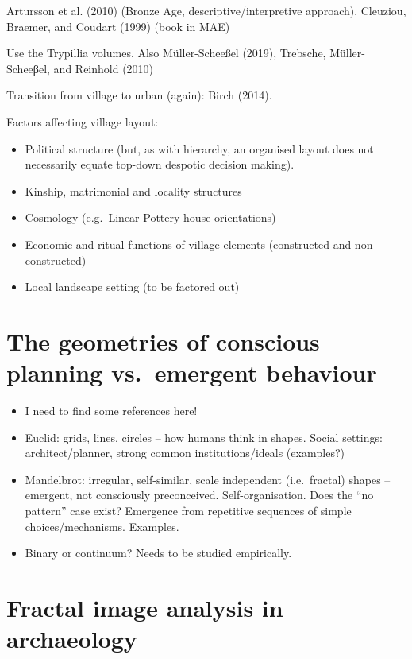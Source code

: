 \documentclass[
  12pt,
]{book}
\begin{document}
Artursson et al. (2010) (Bronze Age, descriptive/interpretive approach). Cleuziou, Braemer, and Coudart (1999) (book in MAE)

Use the Trypillia volumes. Also Müller-Scheeßel (2019), Trebsche, Müller-Scheeβel, and Reinhold (2010)

Transition from village to urban (again): Birch (2014).

Factors affecting village layout:

\begin{itemize}
\item
  Political structure (but, as with hierarchy, an organised layout does not necessarily equate top-down despotic decision making).
\item
  Kinship, matrimonial and locality structures
\item
  Cosmology (e.g.~Linear Pottery house orientations)
\item
  Economic and ritual functions of village elements (constructed and non-constructed)
\item
  Local landscape setting (to be factored out)
\end{itemize}

\hypertarget{the-geometries-of-conscious-planning-vs.-emergent-behaviour}{%
\section{The geometries of conscious planning vs.~emergent behaviour}\label{the-geometries-of-conscious-planning-vs.-emergent-behaviour}}

\begin{itemize}
\item
  I need to find some references here!
\item
  Euclid: grids, lines, circles -- how humans think in shapes. Social settings: architect/planner, strong common institutions/ideals (examples?)
\item
  Mandelbrot: irregular, self-similar, scale independent (i.e.~fractal) shapes -- emergent, not consciously preconceived. Self-organisation. Does the ``no pattern'' case exist? Emergence from repetitive sequences of simple choices/mechanisms. Examples.
\item
  Binary or continuum? Needs to be studied empirically.
\end{itemize}

\hypertarget{image-archaeo}{%
\section{Fractal image analysis in archaeology}\label{image-archaeo}}
\end{document}
